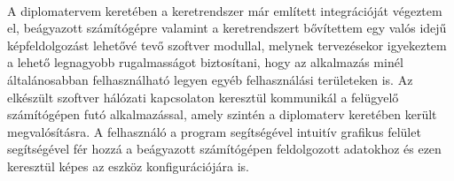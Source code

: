 \\
A diplomatervem keretében a keretrendszer már említett integrációját végeztem el, beágyazott számítógépre valamint a keretrendszert bővítettem egy valós idejű képfeldolgozást lehetővé tevő szoftver modullal, melynek tervezésekor igyekeztem a lehető legnagyobb rugalmasságot biztosítani, hogy az alkalmazás minél általánosabban felhasználható legyen egyéb felhasználási területeken is. Az elkészült szoftver hálózati kapcsolaton keresztül kommunikál a felügyelő számítógépen futó alkalmazással, amely szintén a diplomaterv keretében került megvalósításra. A felhasználó a program segítségével intuitív grafikus felület segítségével fér hozzá a beágyazott számítógépen feldolgozott adatokhoz és ezen keresztül képes az eszköz konfigurációjára is.